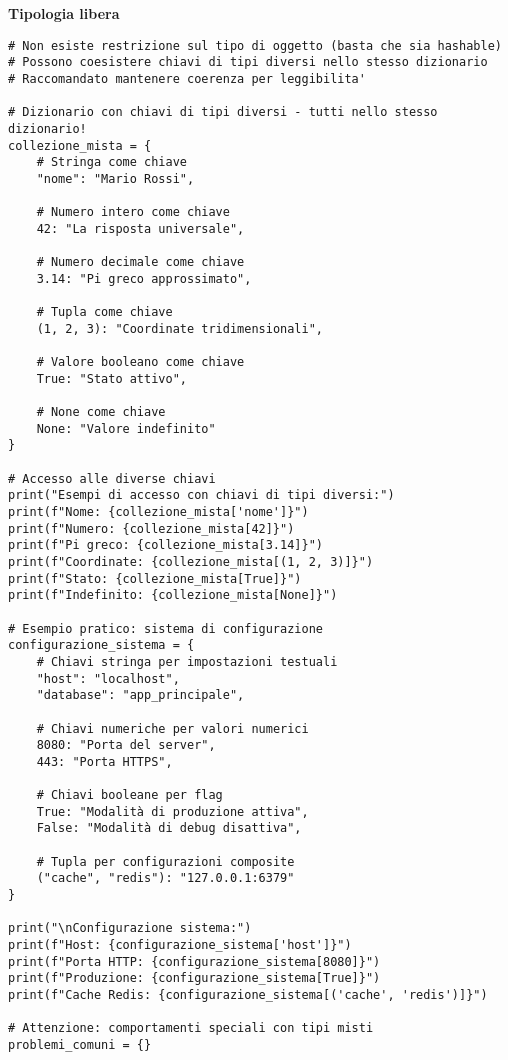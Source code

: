 \vspace{0.5cm}

\textbf{Tipologia libera}
\begin{lstlisting}
# Non esiste restrizione sul tipo di oggetto (basta che sia hashable)
# Possono coesistere chiavi di tipi diversi nello stesso dizionario
# Raccomandato mantenere coerenza per leggibilita'

# Dizionario con chiavi di tipi diversi - tutti nello stesso dizionario!
collezione_mista = {
    # Stringa come chiave
    "nome": "Mario Rossi",
    
    # Numero intero come chiave
    42: "La risposta universale",
    
    # Numero decimale come chiave
    3.14: "Pi greco approssimato",
    
    # Tupla come chiave
    (1, 2, 3): "Coordinate tridimensionali",
    
    # Valore booleano come chiave
    True: "Stato attivo",
    
    # None come chiave
    None: "Valore indefinito"
}

# Accesso alle diverse chiavi
print("Esempi di accesso con chiavi di tipi diversi:")
print(f"Nome: {collezione_mista['nome']}")
print(f"Numero: {collezione_mista[42]}")
print(f"Pi greco: {collezione_mista[3.14]}")
print(f"Coordinate: {collezione_mista[(1, 2, 3)]}")
print(f"Stato: {collezione_mista[True]}")
print(f"Indefinito: {collezione_mista[None]}")

# Esempio pratico: sistema di configurazione
configurazione_sistema = {
    # Chiavi stringa per impostazioni testuali
    "host": "localhost",
    "database": "app_principale",
    
    # Chiavi numeriche per valori numerici
    8080: "Porta del server",
    443: "Porta HTTPS",
    
    # Chiavi booleane per flag
    True: "Modalità di produzione attiva",
    False: "Modalità di debug disattiva",
    
    # Tupla per configurazioni composite
    ("cache", "redis"): "127.0.0.1:6379"
}

print("\nConfigurazione sistema:")
print(f"Host: {configurazione_sistema['host']}")
print(f"Porta HTTP: {configurazione_sistema[8080]}")
print(f"Produzione: {configurazione_sistema[True]}")
print(f"Cache Redis: {configurazione_sistema[('cache', 'redis')]}")

# Attenzione: comportamenti speciali con tipi misti
problemi_comuni = {}


\end{lstlisting}
